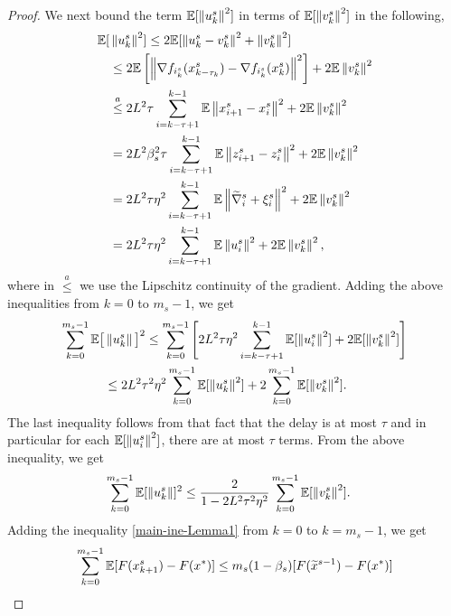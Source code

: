 \begin{proof}
We next bound the term $\mathbb{E}[\left\lVert u_k^s\right\rVert^2]$ in terms of $\mathbb{E}[\left\lVert v_k^s\right\rVert^2]$ in the following,
\begin{gather}
\begin{split}
\E[&\norm{u^s_k}^2]\leq 2\E[\norm{u^s_k-v^s_k}^2+\norm{v^s_k}^2]\\
&\leq 2\E\left[\norm{ \nabla f_{i_k^s}(x_{k-\tau_k}^s) - \nabla f_{i_k^s}(x_{k}^s)}^2\right] + 2\E\norm{v^s_k}^2\\
&\stackrel{a}{\leq} 2 {L}^2\tau \sum_{i=k-\tau+1}^{k-1}\E\norm{x_{i+1}^s-x_{i}^s}^2+ 2\E\norm{v^s_k}^2\\
&= 2 {L}^2\beta_s^2\tau \sum_{i=k-\tau+1}^{k-1}\E\norm{z_{i+1}^s-z_{i}^s}^2+ 2\E\norm{v^s_k}^2\\
&= 2 {L}^2\tau \eta^2\sum_{i=k-\tau+1}^{k-1} \E\norm{\widetilde{\nabla}_{i}^s+\xi_{i}^s}^2+ 2\E\norm{v^s_k}^2\\
&= 2 {L}^2\tau \eta^2\sum_{i=k-\tau+1}^{k-1} \E\norm{u^s_i}^2+ 2\E\norm{v^s_k}^2,
\end{split}
\raisetag{20pt}
\end{gather}
where in $\stackrel{a}{\leq}$ we use the Lipschitz
continuity of the gradient. 
Adding the above inequalities
from $k=0$ to $m_s-1$, we get
\begin{gather}
\begin{split}
\sum_{k=0}^{m_s-1}\E\big[&\norm{u^s_k}\big]^2\leq \sum_{k=0}^{m_s-1}\left[2L^2 \tau\eta^2\sum_{i=k-\tau+1}^{k-1} \E[\norm{u^s_i}^2]+2\E[\norm{v^s_k}^2]\right]\\
&\leq 2L^2 \tau^2\eta^2\sum_{k=0}^{m_s-1}\E[\norm{u^s_k}^2]+2\sum_{k=0}^{m_s-1}\E[\norm{v^s_k}^2].
\end{split}
\raisetag{20pt}
\end{gather}
The last inequality follows from that fact that the delay is at most $\tau$ and in particular for each  $\mathbb{E}[\left\lVert u^s_i\right\rVert^2]$, there are at most $\tau$ terms. From the above inequality, we get 
\begin{equation}\label{Eq6-Lemma1}
\begin{split}
\sum_{k=0}^{m_s-1} \mathbb{E}[\left\lVert u^s_k\right\rVert]^2&\leq \frac{2}{1-2L^2 \tau^2\eta^2}\sum_{k=0}^{m_s-1}\mathbb{E}[\left\lVert v^s_k\right\rVert^2].
\end{split}
\end{equation}
Adding the inequality \eqref{main-ine-Lemma1} from $k=0$ to $k=m_s-1$, we get
\begin{equation}\label{lemma-finaleq1-1}
\begin{split}
\sum_{k=0}^{m_s-1}\E[F(x_{k+1}^s)&-F(x^*)] \leq m_s(1-\beta_s)[F(\widetilde{x}^{s-1})-F(x^*)]\\

\end{split}
\end{equation}
\end{proof}
